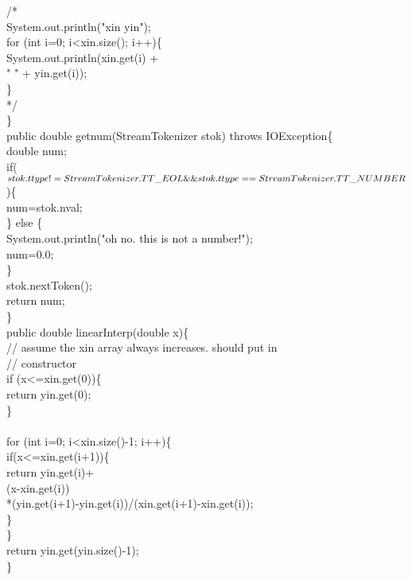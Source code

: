 	/* \\
          System.out.println("xin    yin"); \\
          for (int i=0; i<xin.size(); i++)\{ \\
            System.out.println(xin.get(i) + \\
                              "    " + yin.get(i)); \\
          \} \\
	*/ \\
   \} \\
    public double getnum(StreamTokenizer stok) throws IOException\{ \\
        double num; \\
        if($ stok.ttype != StreamTokenizer.TT\_EOL \& \& \\
            stok.ttype == StreamTokenizer.TT\_NUMBER$ )\{ \\
            num=stok.nval; \\
        \} else \{ \\
          System.out.println("oh no.  this is not a number!"); \\
          num=0.0; \\
        \} \\
        stok.nextToken(); \\
        return num; \\
    \} \\
    public double linearInterp(double x)\{ \\
        // assume the xin array always increases.  should put in  \\
        // constructor \\
	if (x<=xin.get(0))\{ \\
            return yin.get(0); \\
        \} \\
 \\
        for (int i=0; i<xin.size()-1; i++)\{ \\
            if(x<=xin.get(i+1))\{ \\
                 return yin.get(i)+ \\
                          (x-xin.get(i)) \\
			    *(yin.get(i+1)-yin.get(i))/(xin.get(i+1)-xin.get(i)); \\
            \} \\
        \} \\
        return yin.get(yin.size()-1); \\
    \} \\
